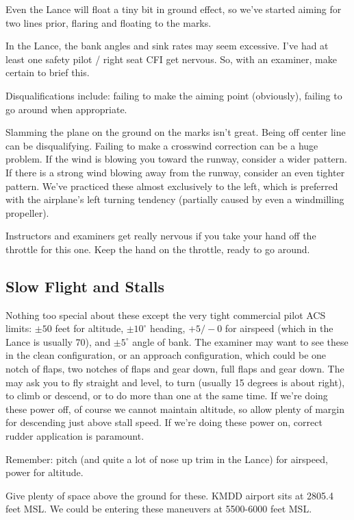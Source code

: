 Even the Lance will float a tiny bit in ground effect, so we've started aiming for two lines prior, flaring and floating to the marks.

In the Lance, the bank angles and sink rates may seem excessive. I've had at least one safety pilot / right seat CFI get nervous. So, with an examiner, make certain to brief this.

Disqualifications include: failing to make the aiming point (obviously), failing to go around when appropriate.

Slamming the plane on the ground on the marks isn't great. Being off center line can be disqualifying. Failing to make a crosswind correction can be a huge problem. If the wind is blowing you toward the runway, consider a wider pattern. If there is a strong wind blowing away from the runway, consider an even tighter pattern. We've practiced these almost exclusively to the left, which is preferred with the airplane's left turning tendency (partially caused by even a windmilling propeller).

Instructors and examiners get really nervous if you take your hand off the throttle for this one. Keep the hand on the throttle, ready to go around.

\subsection{Slow Flight and Stalls}

Nothing too special about these except the very tight commercial pilot ACS limits: $\pm50$ feet for altitude, $\pm10^\circ$ heading, $+5/-0$ for airspeed (which in the Lance is usually 70), and $\pm5^\circ$ angle of bank. The examiner may want to see these in the clean configuration, or an approach configuration, which could be one notch of flaps, two notches of flaps and gear down, full flaps and gear down. The may ask you to fly straight and level, to turn (usually 15 degrees is about right), to climb or descend, or to do more than one at the same time. If we're doing these power off, of course we cannot maintain altitude, so allow plenty of margin for descending just above stall speed. If we're doing these power on, correct rudder application is paramount.

Remember: pitch (and quite a lot of nose up trim in the Lance) for airspeed, power for altitude.

Give plenty of space above the ground for these. KMDD airport sits at 2805.4 feet MSL. We could be entering these maneuvers at 5500-6000 feet MSL.

